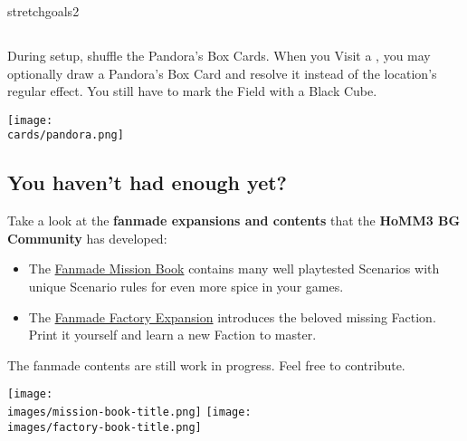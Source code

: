 \begin{multicols*}{2}
\vspace*{1em}
\begin{expansion}{stretchgoals2}
  \subsection*{}
  During setup, shuffle the Pandora's Box Cards.
  When you Visit a , you may optionally draw a Pandora's Box Card and resolve it instead of the location's regular effect.
  You still have to mark the Field with a Black Cube.

  \medskip
  \begin{center}
    \texttt{[image: \\cards/pandora.png]}
  \end{center}
\end{expansion}

\columnbreak

\subsection*{You haven't had enough yet?}
Take a look at the \textbf{fanmade expansions and contents} that the \textbf{HoMM3 BG Community} has developed:

  \begin{itemize}
    \item The \href{https://github.com/qwrtln/Homm3BG-mission-book}{Fanmade Mission Book} contains many well playtested Scenarios with unique Scenario rules for even more spice in your games.
    \item The \href{https://github.com/piotrbruzda/Homm3BG-FactoryRulebook}{Fanmade Factory Expansion} introduces the beloved missing Faction. Print it yourself and learn a new Faction to master.
  \end{itemize}

  The fanmade contents are still work in progress. Feel free to contribute.

  \begin{multicols}{2}
      \texttt{[image: \\images/mission-book-title.png]}
      \texttt{[image: \\images/factory-book-title.png]}
  \end{multicols}

\end{multicols*}
